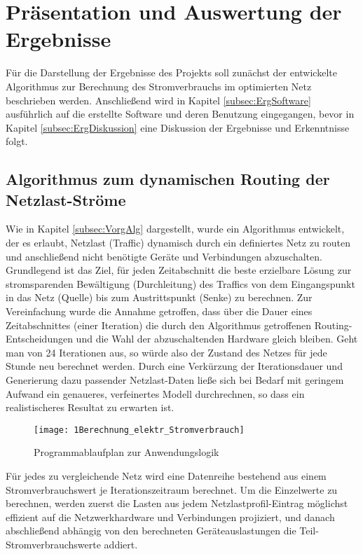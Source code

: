 
\section{Präsentation und Auswertung der Ergebnisse} \label{sec:Erg}
Für die Darstellung der Ergebnisse des Projekts soll zunächst der entwickelte Algorithmus zur Berechnung des Stromverbrauchs im optimierten Netz beschrieben werden. Anschließend wird in Kapitel \ref{subsec:ErgSoftware} ausführlich auf die erstellte Software  und deren Benutzung eingegangen, bevor in Kapitel \ref{subsec:ErgDiskussion} eine Diskussion der Ergebnisse und Erkenntnisse folgt.

\subsection{Algorithmus zum dynamischen Routing der Netzlast-Ströme} \label{subsec:ErgAlg}
Wie in Kapitel \ref{subsec:VorgAlg} dargestellt, wurde ein Algorithmus entwickelt, der es erlaubt, Netzlast (Traffic) dynamisch durch ein definiertes Netz zu routen und anschließend nicht benötigte Geräte und Verbindungen abzuschalten.
Grundlegend ist das Ziel, für jeden Zeitabschnitt die beste erzielbare Lösung zur stromsparenden Bewältigung (Durchleitung) des Traffics von dem Eingangspunkt in das Netz (Quelle) bis zum Austrittspunkt (Senke) zu berechnen. Zur Vereinfachung wurde die Annahme getroffen, dass über die Dauer eines Zeitabschnittes (einer Iteration) die durch den Algorithmus getroffenen Routing-Entscheidungen und die Wahl der abzuschaltenden Hardware gleich bleiben. Geht man von 24 Iterationen aus, so würde also der Zustand des Netzes für jede Stunde neu berechnet werden. Durch eine Verkürzung der Iterationsdauer und Generierung dazu passender Netzlast-Daten ließe sich bei Bedarf mit geringem Aufwand ein genaueres, verfeinertes Modell durchrechnen, so dass ein realistischeres Resultat zu erwarten ist.


\begin{figure}[!ht]
	\centering
	\texttt{[image: 1Berechnung\_elektr\_Stromverbrauch]}
	\caption{Programmablaufplan zur Anwendungslogik}
	\label{fig:1Berechnung_elektr_Stromverbrauch}
\end{figure}


Für jedes zu vergleichende Netz wird eine Datenreihe bestehend aus einem Stromverbrauchswert je Iterationszeitraum berechnet. Um die Einzelwerte zu berechnen, werden zuerst die Lasten aus jedem Netzlastprofil-Eintrag möglichst effizient auf die Netzwerkhardware und Verbindungen projiziert, und danach abschließend abhängig von den berechneten Geräteauslastungen die Teil-Stromverbrauchswerte addiert.


